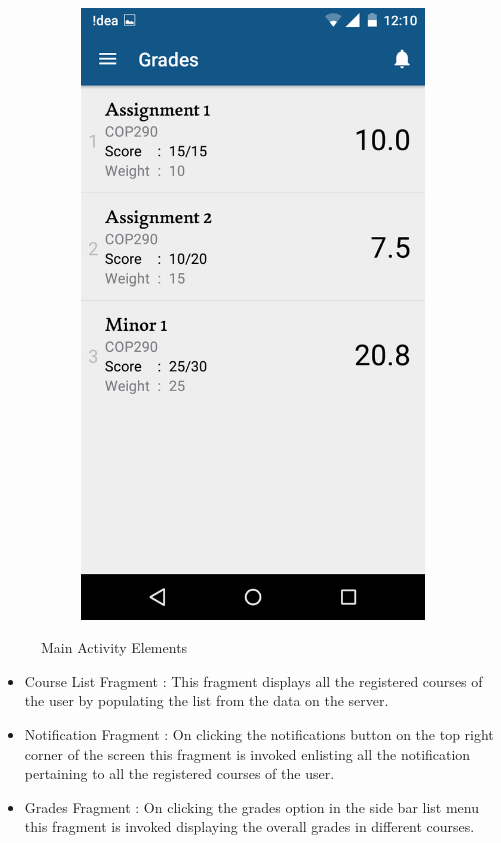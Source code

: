 \documentclass{article}
\begin{document}
\begin{itemize}
\begin{figure}[!h]
\begin{subfigure}{.4\textwidth}
	\includegraphics[width=0.8\linewidth]{pic5}
\end{subfigure}
\caption*{Main Activity Elements}
\end{figure}
\begin{itemize}
	\item Course List Fragment : This fragment displays all the registered courses of the user by populating the list from the data on the server.\\ 
	\item Notification Fragment : On clicking the notifications button on the top right corner of the screen this fragment is invoked enlisting all the notification pertaining to all the registered courses of the user.\\
	\item Grades Fragment : On clicking the grades option in the side bar list menu this fragment is invoked displaying the overall grades in different courses.\\

\end{itemize}
\end{itemize}
\end{document}
